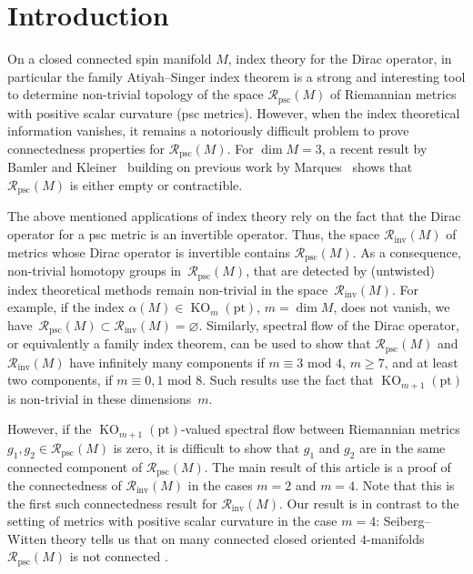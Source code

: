 \documentclass[11pt]{article}
\numberwithin{equation}{section}
\newcommand\<{\langle}
\renewcommand\>{\rangle}
\newcommand\point{\mathrm{pt}}
\newcommand{\KO}{{\operatorname{KO}}}
\newcommand{\mod}{\,\,\mathrm{mod}\,\,}
\newcommand{\maR}{\mathcal R}
\theoremstyle{definition}
\newcommand\={\,=\,}
\newcommand\Rinv{\maR_{\mathrm{inv}}}
\newcommand\Rpsc{\maR_{\mathrm{psc}}}
\numberwithin{equation}{section}
\begin{document}
\section{Introduction}

On a closed connected spin manifold $M$, index theory for the Dirac operator, in particular the family Atiyah--Singer index theorem is a strong and interesting tool to determine non-trivial topology of the space $\Rpsc(M)$ of Riemannian metrics with positive scalar curvature (psc metrics). However, when the index theoretical information vanishes, it remains a notoriously difficult problem to prove connectedness properties for $\Rpsc(M)$. For $\dim M=3$, a recent result by Bamler and Kleiner~\cite{bamler.kleiner:2019p} building on previous work by Marques~\cite{marques:2012} shows that $\Rpsc(M)$ is either empty or contractible.

The above mentioned applications of index theory rely on the fact that the Dirac operator for a psc metric is an invertible operator. Thus, the space $\Rinv(M)$ of metrics whose Dirac operator is invertible contains $\Rpsc(M)$. As a consequence, non-trivial homotopy groups in~$\Rpsc(M)$, that are detected by (untwisted) index theoretical methods remain non-trivial in the space~$\Rinv(M)$. For example, if the index $\alpha(M)\in \KO_m(\point)$, $m=\dim M$, does not vanish, we have~${\Rpsc(M)\subset\Rinv(M)=\varnothing}$. Similarly, spectral flow of the Dirac operator, or equivalently a family index theorem, can be used to show that $\Rpsc(M)$ and $\Rinv(M)$ have infinitely many components if $m\equiv 3 \mod 4$, $m\geq 7$, and at least two components, if $m\equiv 0,1\mod 8$. Such results use the fact that $\KO_{m+1}(\point)$ is non-trivial in these dimensions~$m$.

However, if the $\KO_{m+1}(\point)$-valued spectral flow between Riemannian metrics $g_1,g_2\!\in\! \Rpsc(M)$ is zero, it is difficult to show that $g_1$ and $g_2$ are in the same connected component of $\Rpsc(M)$. The main result of this article is a proof of the connectedness of $\Rinv(M)$ in the cases $m=2$ and $m=4$. Note that this is the first such connectedness result for $\Rinv(M)$. Our result is in contrast to the setting of metrics with positive scalar curvature in the case $m=4$: Seiberg--Witten theory tells us that on many connected closed oriented $4$-manifolds $\Rpsc(M)$ is not connected \cite[Sections~5 and~6]{ruberman:2001}.
\end{document}
